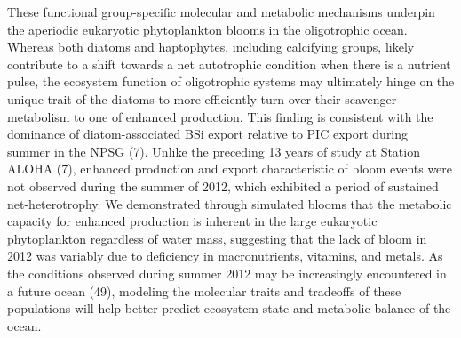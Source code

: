 These functional group-specific molecular and metabolic mechanisms underpin the aperiodic eukaryotic phytoplankton blooms in the oligotrophic ocean. Whereas both diatoms and haptophytes, including calcifying groups, likely contribute to a shift towards a net autotrophic condition when there is a nutrient pulse, the ecosystem function of oligotrophic systems may ultimately hinge on the unique trait of the diatoms to more efficiently turn over their scavenger metabolism to one of enhanced production. This finding is consistent with the dominance of diatom-associated BSi export relative to PIC export during summer in the NPSG (7). Unlike the preceding 13 years of study at Station ALOHA (7), enhanced production and export characteristic of bloom events were not observed during the summer of 2012, which exhibited a period of sustained net-heterotrophy. We demonstrated through simulated blooms that the metabolic capacity for enhanced production is inherent in the large eukaryotic phytoplankton regardless of water mass, suggesting that the lack of bloom in 2012 was variably due to deficiency in macronutrients, vitamins, and metals. As the conditions observed during summer 2012 may be increasingly encountered in a future ocean (49), modeling the molecular traits and tradeoffs of these populations will help better predict ecosystem state and metabolic balance of the ocean. 

